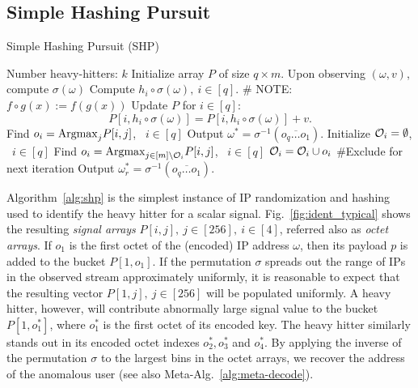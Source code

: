 \documentclass[10pt, conference, letterpaper,onecolumn]{IEEEtranv1.8}
\theoremstyle{plain}\newtheorem{thm}{Theorem}\newtheorem{lem}{Lemma}
\theoremstyle{definition}
\begin{document}
\subsection{Simple Hashing Pursuit}
\label{sec:simple}








\setcounter{algorithm}{0}
\begin{algorithm}[t]
\caption{Simple Hashing Pursuit (SHP)}
\label{alg:shp}
\begin{algorithmic}[1]
\REQUIRE Number heavy-hitters: $k$
\STATE [Start]   Initialize array $P$ of size $q \times m$.
\STATE [Permute]  Upon observing $(\omega, v)$, compute $\sigma (\omega)$
\STATE [Hash]  Compute $h_i\circ \sigma (\omega), \ i \in [q]$.  \# NOTE: $f\circ g (x):=f(g(x))$ 
\STATE [Update]    Update  $P$ for $i \in [q]$:
   $$
    P[i, h_i \circ \sigma(\omega)] = P[i,h_i\circ \sigma(\omega)] + v.
   $$
 \vspace{-10pt}  
 \STATE Find $o_i = {\rm Argmax}_{j} P[i,j]$, \ $i\in[q]$ 
 \STATE [decode] Output $\omega^* = \sigma^{-1}(\overline{o_q \ldots o_1})$. 
 \ELSE
  \STATE Initialize ${\cal O}_i = \emptyset$, \ $i\in[q]$ 
        \STATE Find $o_i = {\rm Argmax}_{j\in[m] \setminus {\cal O}_i  } P[i,j]$, \ $i\in[q]$ 
        \STATE ${\cal O}_i  = {\cal O}_i \cup  o_i $  {\#Exclude for next iteration }
         \STATE [decode] Output $\omega_r^* = \sigma^{-1}(\overline{o_q \ldots o_1})$. 
   \ENDFOR
 \ENDIF    
 \ENDIF    
\end{algorithmic}
\end{algorithm} 








Algorithm~\ref{alg:shp} is the simplest instance of IP randomization and hashing used to identify the
heavy hitter for a scalar signal.  Fig.~\ref{fig:ident_typical} shows the resulting {\em signal arrays} 
$P[i,j],\ j \in [256],\ i\in[4]$, referred also as \emph{octet arrays}. If $o_1$ is the first octet of 
the (encoded) IP address $\omega$, then its payload $p$ is added to the bucket $P[1,o_1]$.
If the permutation $\sigma$ spreads out the range of IPs in the observed stream approximately uniformly,
 it is reasonable to expect that the resulting vector $P[1,j],\ j\in[256]$ 
will be populated uniformly.  A heavy hitter, however, will contribute abnormally large signal value to the bucket
$P[1,o_1^*]$, where  $o_1^*$ is the first octet of its encoded key. The heavy hitter similarly stands out in its encoded octet indexes $o_2^*, o_3^*$ and $o_4^*$. By applying the inverse of the permutation $\sigma$ to the largest bins 
in the octet arrays, we recover the address of the anomalous user (see also Meta-Alg.\ \ref{alg:meta-decode}). 
\end{document}
